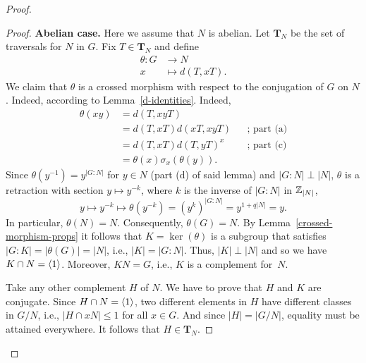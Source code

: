 \begin{solution}
\begin{proof}
\begin{proof}
    \textbf{Abelian case.} Here we assume that $N$ is abelian. Let $\mathbf T_N$ be the set of traversals for $N$ in $G$. Fix $T\in\mathbf T_N$ and define
    \begin{align*}
        \theta\colon G&\to N\\
        x&\mapsto d(T,xT).
    \end{align*}
    We claim that $\theta$ is a crossed morphism with respect to the conjugation of $G$ on $N$. Indeed, according to Lemma~\ref{d-identities}. Indeed,
    \begin{align*}
        \theta(xy) &= d(T,xyT)\\
            &= d(T,xT)d(xT,xyT) &&\text{; part (a)}\\
            &= d(T,xT)d(T,yT)^x &&\text{; part (c)}\\
            &= \theta(x)\sigma_x(\theta(y)).
    \end{align*}    
    Since $\theta(y^{-1})=y^{|G:N|}$ for $y\in N$ (part (d) of said lemma) and $|G:N|\perp|N|$, $\theta$ is a retraction with section $y\mapsto y^{-k}$, where $k$ is the inverse of $|G:N|$ in $\mathbb{Z}_{|N|}$,
    $$
        y\mapsto y^{-k}\mapsto\theta(y^{-k})=(y^k)^{|G:N|}= y^{1+q|N|}=y.
    $$
    In particular, $\theta(N)=N$. Consequently, $\theta(G)=N$. By Lemma~\ref{crossed-morphism-props} it follows that $K=\ker(\theta)$ is a subgroup that satisfies $|G:K|=|\theta(G)|=|N|$, i.e., $|K|=|G:N|$. Thus, $|K|\perp|N|$ and so we have $K\cap N=\langle1\rangle$. Moreover, $KN=G$, i.e., $K$ is a complement for~$N$.
    
    Take any other complement $H$ of $N$. We have to prove that $H$ and $K$ are conjugate. Since $H\cap N=\langle1\rangle$, two different elements in $H$ have different classes in $G/N$, i.e., $|H\cap xN|\le1$ for all $x\in G$. And since $|H|=|G/N|$, equality must be attained everywhere. It follows that $H\in\mathbf T_N$.
    

\end{proof}
\end{proof}
\end{solution}
